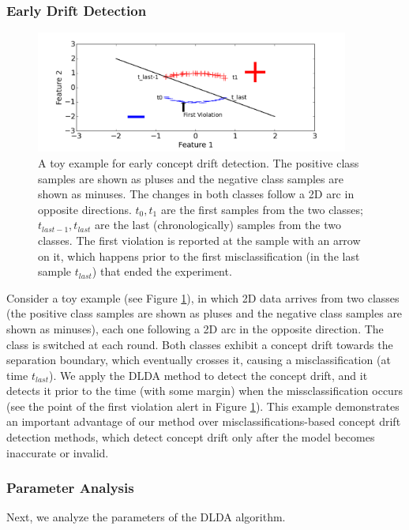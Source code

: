 \subsubsection{Early Drift Detection}\label{sec:earlydetection}
\begin{figure}[ht]
	\centering
	\includegraphics[height=4cm]{EarlyDetection.png}
	\caption{A toy example for early concept drift detection. The positive class samples are shown as pluses and the negative class samples are shown as minuses. The changes in both classes follow a 2D arc in opposite directions. $t_0, t_1$ are the first samples from the two classes; $t_{last-1}, t_{last}$ are the last (chronologically) samples from the two classes. The first violation is reported at the sample with an arrow on it, which happens prior to the first misclassification (in the  last sample $t_{last}$) that ended the experiment.}
	\label{EarlyDetection}
\end{figure}
Consider a toy example (see Figure \ref{EarlyDetection}), in which 2D data arrives from two classes (the positive class samples are shown as pluses and the negative class samples are shown as minuses), each one following a 2D arc in the opposite direction. The class is switched at each round. Both classes exhibit a concept drift towards the separation boundary, which eventually crosses it, causing a misclassification (at time $t_{last}$). We apply the DLDA method to detect the concept drift, and it detects it prior to the time (with some margin) when the missclassification occurs (see the point of the first violation alert in Figure \ref{EarlyDetection}). This example demonstrates an important advantage of our method over misclassifications-based concept drift detection methods, which detect concept drift only after the model becomes inaccurate or invalid.

\subsubsection{Parameter Analysis}\label{sec:paramanal}
Next, we analyze the parameters of the DLDA algorithm.

